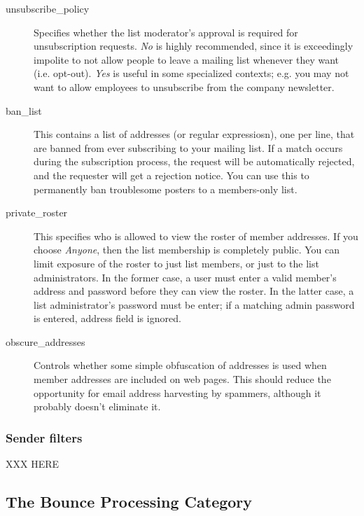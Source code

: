 \documentclass{howto}
\begin{document}
\begin{description}
\begin{itemize}
    \end{itemize}

\item[unsubscribe_policy]
    Specifies whether the list moderator's approval is required for
    unsubscription requests.  \emph{No} is highly recommended, since
    it is exceedingly impolite to not allow people to leave a mailing
    list whenever they want (i.e. opt-out).  \emph{Yes} is useful in
    some specialized contexts; e.g. you may not want to allow
    employees to unsubscribe from the company newsletter.

\item[ban_list]
    This contains a list of addresses (or regular expressiosn), one
    per line, that are banned from ever subscribing to your mailing
    list.  If a match occurs during the subscription process, the
    request will be automatically rejected, and the requester will get
    a rejection notice.  You can use this to permanently ban
    troublesome posters to a members-only list.

\item[private_roster]
    This specifies who is allowed to view the roster of member
    addresses.  If you choose \emph{Anyone}, then the list membership
    is completely public.  You can limit exposure of the roster to
    just list members, or just to the list administrators.  In the
    former case, a user must enter a valid member's address and
    password before they can view the roster.  In the latter case, a
    list administrator's password must be enter; if a matching admin
    password is entered, address field is ignored.

\item[obscure_addresses]
    Controls whether some simple obfuscation of addresses is used when
    member addresses are included on web pages.  This should reduce
    the opportunity for email address harvesting by spammers, although
    it probably doesn't eliminate it.
\end{description}

\subsubsection{Sender filters}

XXX HERE

\subsection{The Bounce Processing Category}
\end{document}
